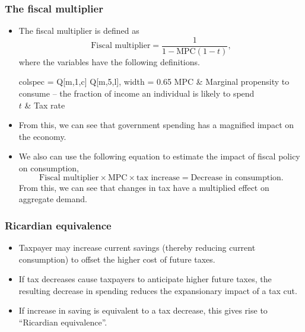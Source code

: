 \documentclass[../notes_compiled.tex]{subfiles}
\begin{document}
\subsubsection{The fiscal multiplier}
\begin{itemize}
\item The fiscal multiplier is defined as
\begin{equation}
\text{Fiscal multiplier} = \frac{1}{1-\text{MPC}(1-t)},
\end{equation}
where the variables have the following definitions.
\begin{table}[H]
\centering
\begin{tblr}{colspec = {Q[m,1,c] Q[m,5,l]}, width = 0.65\textwidth}
MPC & Marginal propensity to consume -- the fraction of income an individual is likely to spend \\
$t$ & Tax rate
\end{tblr}
\end{table}

\item[] From this, we can see that government spending has a magnified impact on the economy. 

\item We also can use the following equation to estimate the impact of fiscal policy on consumption, 
\begin{equation}
\text{Fiscal multiplier} \times \text{MPC} \times \text{tax increase} = \text{Decrease in consumption}.
\end{equation}
From this, we can see that changes in tax have a multiplied effect on aggregate demand.
\end{itemize}

\subsubsection{Ricardian equivalence}
\begin{itemize}
\item Taxpayer may increase current savings (thereby reducing current consumption) to offset the higher cost of future taxes.
\item If tax decreases cause taxpayers to anticipate higher future taxes, the resulting decrease in spending reduces the expansionary impact of a tax cut.
\item If increase in saving is equivalent to a tax decrease, this gives rise to ``Ricardian equivalence''.
\end{itemize}
\end{document}
